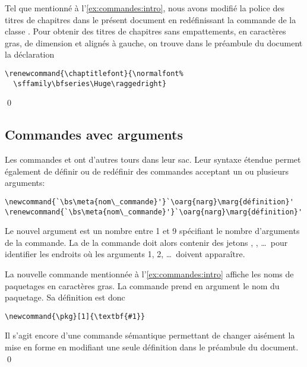 \begin{exemple}
  Tel que mentionné à l'\autoref{ex:commandes:intro}, nous avons
  modifié la police des titres de chapitres dans le présent document
  en redéfinissant la commande \cmdprint{\chaptitlefont} de la classe
  . Pour obtenir des titres de chapitres sans
  empattements, en caractères gras, de dimension \cmdprint{\Huge} et
  alignés à gauche, on trouve dans le préambule du document la
  déclaration
\begin{lstlisting}
\renewcommand{\chaptitlefont}{\normalfont%
  \sffamily\bfseries\Huge\raggedright}
\end{lstlisting}
  \qed
\end{exemple}


\subsection{Commandes avec arguments}
\label{sec:commandes:commandes:avec_arg}

Les commandes \cmdprint{\newcommand} et \cmdprint{\renewcommand} ont
d'autres tours dans leur sac. Leur syntaxe étendue permet également de
définir ou de redéfinir des commandes acceptant un ou plusieurs
arguments:
\begin{lstlisting}
\newcommand{`\bs\meta{nom\_commande}'}`\oarg{narg}\marg{définition}'
\renewcommand{`\bs\meta{nom\_commande}'}`\oarg{narg}\marg{définition}'
\end{lstlisting}
Le nouvel argument  est un nombre entre 1 et 9
spécifiant le nombre d'arguments de la commande. La 
de la commande doit alors contenir des jetons , ,
\dots\ pour identifier les endroits où les arguments 1, 2, \dots\
doivent apparaître.

\begin{exemple}
  La nouvelle commande \cmdprint{\pkg} mentionnée à
  l'\autoref{ex:commandes:intro} affiche les noms de paquetages en
  caractères gras. La commande prend en argument le nom du paquetage.
  Sa définition est donc
\begin{lstlisting}
\newcommand{\pkg}[1]{\textbf{#1}}
\end{lstlisting}
  Il s'agit encore d'une commande sémantique permettant de changer
  aisément la mise en forme en modifiant une seule définition dans le
  préambule du document. %
  \qed
\end{exemple}

